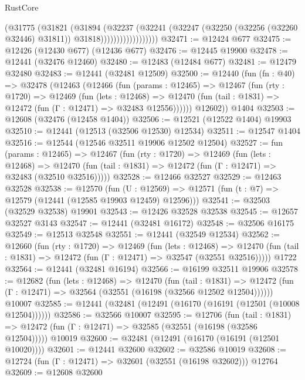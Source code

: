 \begin{lexlean}{RustCore}
\begin{coremodule}
                            (@31775
                              (@31821
                                (@31894
                                  (@32237
                                    (@32241
                                      (@32247
                                        (@32250 (@32256 (@32260 @32446) @31811))
                                        @31818))))))))))))))))))
@32471 := @12424 @677
@32475 := @12426 (@12430 @677) (@12436 @677)
@32476 := @12445 @19900
@32478 := @12441 (@32476 @12460)
@32480 := @12483 (@12484 @677)
@32481 := @12479 @32480
@32483 := @12441 (@32481 @12509)
@32500 := @12440
    (fun (fn : @40) =>
    @32478
      (@12463
        (@12466
          (fun (params : @12465) =>
          @12467
            (fun (rty : @1720) =>
            @12469
              (fun (lets : @12468) =>
              @12470 (fun (tail : @1831) => @12472 (fun (Γ : @12471) => @32483 @12556))))))
        @12602))
    @1404
@32503 := @12608 (@32476 (@12458 @1404))
@32506 := @12521 (@12522 @1404) @19903
@32510 := @12441 (@12513 (@32506 @12530) @12534)
@32511 := @12547 @1404
@32516 := @12544 (@12546 @32511 @19906 @12502 @12504)
@32527 := fun (params : @12465) =>
  @12467
    (fun (rty : @1720) =>
    @12469
      (fun (lets : @12468) =>
      @12470 (fun (tail : @1831) => @12472 (fun (Γ : @12471) => @32483 (@32510 @32516)))))
@32528 := @12466 @32527
@32529 := @12463 @32528
@32538 := @12570
    (fun (U : @12569) => @12571 (fun (t : @7) => @12579 (@12441 (@12585 @19903 @12459) @12596)))
@32541 := @32503 (@32529 @32538) @19901
@32543 := @12426 @32528 @32538
@32545 := @12657 @32527 @3143
@32547 := @12441 (@32481 @16172)
@32548 := @32506 @16175
@32549 := @12513 @32548
@32551 := @12441 (@32549 @12534)
@32562 := @12660
    (fun (rty : @1720) =>
    @12469
      (fun (lets : @12468) =>
      @12470 (fun (tail : @1831) => @12472 (fun (Γ : @12471) => @32547 (@32551 @32516)))))
    @1722
@32564 := @12441 (@32481 @16194)
@32566 := @16199 @32511 @19906
@32578 := @12682
    (fun (lets : @12468) =>
    @12470
      (fun (tail : @1831) =>
      @12472 (fun (Γ : @12471) => @32564 (@32551 (@16198 (@32566 @12502 @12504))))))
    @10007
@32585 := @12441 (@32481 (@12491 (@16170 (@16191 (@12501 (@10008 @12504))))))
@32586 := @32566 @10007
@32595 := @12706
    (fun (tail : @1831) => @12472 (fun (Γ : @12471) => @32585 (@32551 (@16198 (@32586 @12504)))))
    @10019
@32600 := @32481 (@12491 (@16170 (@16191 (@12501 @10020))))
@32601 := @12441 @32600
@32602 := @32586 @10019
@32608 := @12724 (fun (Γ : @12471) => @32601 (@32551 (@16198 @32602))) @12764
@32609 := @12608 @32600

\end{coremodule}
\end{lexlean}
